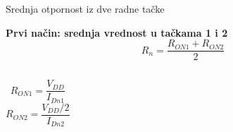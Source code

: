 \begin{frame}[label=09_1-s031]{Srednja otpornost iz dve radne tačke}\setlength{\parskip}{2pt}\setlength{\abovedisplayskip}{4pt}\setlength{\belowdisplayskip}{4pt}\setlength{\abovedisplayshortskip}{3pt}\setlength{\belowdisplayshortskip}{3pt}
\begin{center}\hspace{12mm}\end{center}\textbf{Prvi način: srednja vrednost u tačkama 1 i 2}\[R_n=\dfrac{R_{ON1}+R_{ON2}}2\]
\begin{columns}[T,onlytextwidth]\[R_{ON1}=\frac{V_{DD}}{I_{Dn1}}\]
\[R_{ON2}=\frac{V_{DD}/2}{I_{Dn2}}\]
\end{columns}
\end{frame}

